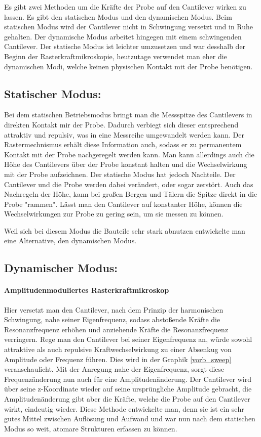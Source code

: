 Es gibt zwei Methoden um die Kräfte der Probe auf den Cantilever wirken zu lassen.
Es gibt den statischen Modus und den dynamischen Modus. 
Beim statischen Modus wird der Cantilever nicht in Schwingung versetzt und in Ruhe gehalten.
Der dynamische Modus arbeitet hingegen mit einem schwingenden Cantilever.
Der statische Modus ist leichter umzusetzen und war desshalb der Beginn der Rasterkraftmikroskopie, heutzutage verwendet man eher die dynamischen Modi, welche keinen physischen Kontakt mit der Probe benötigen.


\subsection{Statischer Modus:}

Bei dem statischen Betriebsmodus bringt man die Messspitze des Cantilevers in direkten Kontakt mir der Probe.
Dadurch verbiegt sich dieser entsprechend attraktiv und repulsiv, was in eine Messreihe umgewandelt werden kann.
Der Rastermechnismus erhält diese Information auch, sodass er zu permanentem Kontakt mit der Probe nachgeregelt werden kann.
Man kann allerdings auch die Höhe des Cantilevers über der Probe konstant halten und die Wechselwirkung mit der Probe aufzeichnen.
Der statische Modus hat jedoch Nachteile.
Der Cantilever und die Probe werden dabei verändert, oder sogar zerstört.
Auch das Nachregeln der Höhe, kann bei großen Bergen und Tälern die Spitze direkt in die Probe "rammen".
Lässt man den Cantilever auf konstanter Höhe, können die Wechselwirkungen zur Probe zu gering sein, um sie messen zu können.

Weil sich bei diesem Modus die Bauteile sehr stark abnutzen entwickelte man eine Alternative, den dynamischen Modus.

\subsection{Dynamischer Modus:}

       \paragraph{Amplitudenmoduliertes Rasterkraftmikroskop}

Hier versetzt man den Cantilever, nach dem Prinzip der harmonischen Schwingung, nahe seiner Eigenfrequenz, sodass abstoßende Kräfte die Resonanzfrequenz erhöhen und anziehende Kräfte die Resonanzfrequenz verringern. 
Rege man den Cantilever bei seiner Eigenfrequenz an, würde sowohl attraktive als auch repulsive Kraftwechselwirkung zu einer Absenkug von Amplitude oder Frequenz führen. Dies wird in der Graphik \ref{vorb_sweep} veranschaulicht.
Mit der Anregung nahe der Eigenfrequenz, sorgt diese Frequenzänderung nun auch für eine Amplitudenänderung.
Der Cantilever wird über seine z-Koordinate wieder auf seine ursprüngliche Amplitude gebracht, die Amplitudenänderung gibt aber die Kräfte, welche die Probe auf den Cantilever wirkt, eindeutig wieder.
Diese Methode entwickelte man, denn sie ist ein sehr gutes Mittel zwischen Auflösung und Aufwand und war nun nach dem statischen Modus so weit, atomare Strukturen erfassen zu können.

